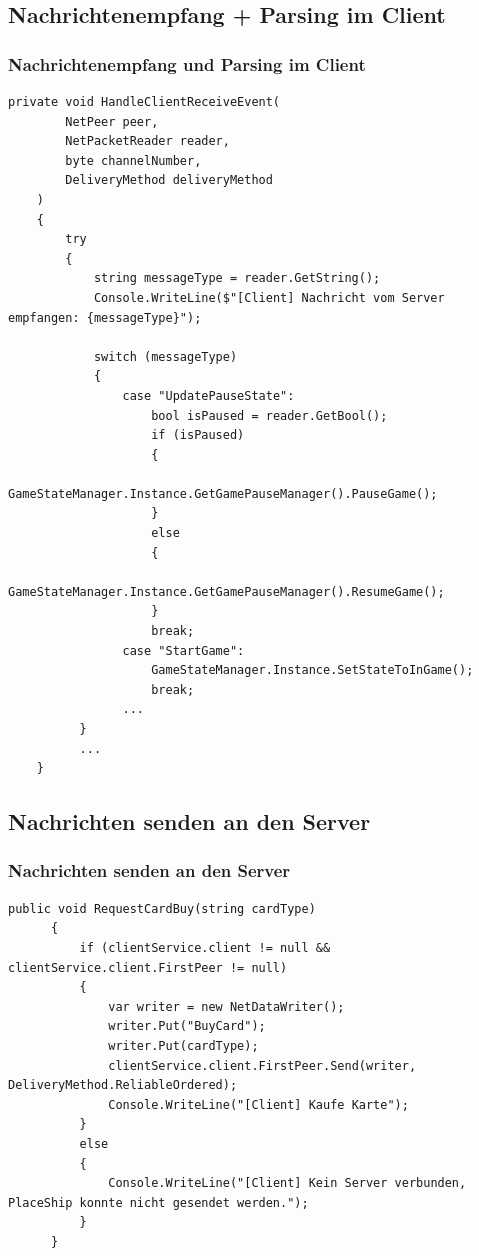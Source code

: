 \documentclass{beamer}
\begin{document}
\subsection{Nachrichtenempfang + Parsing im Client}
\begin{frame}[fragile]
\frametitle{Nachrichtenempfang und Parsing im Client}
  \begin{lstlisting}[language=CSharp, basicstyle=\ttfamily\tiny, breaklines=true]
     private void HandleClientReceiveEvent(
        NetPeer peer,
        NetPacketReader reader,
        byte channelNumber,
        DeliveryMethod deliveryMethod
    )
    {
        try
        {
            string messageType = reader.GetString();
            Console.WriteLine($"[Client] Nachricht vom Server empfangen: {messageType}");

            switch (messageType)
            {
                case "UpdatePauseState":
                    bool isPaused = reader.GetBool();
                    if (isPaused)
                    {
                        GameStateManager.Instance.GetGamePauseManager().PauseGame();
                    }
                    else
                    {
                        GameStateManager.Instance.GetGamePauseManager().ResumeGame();
                    }
                    break;
                case "StartGame":
                    GameStateManager.Instance.SetStateToInGame();
                    break;
                ...
          }
          ...
    }
  \end{lstlisting}
\end{frame}

\subsection{Nachrichten senden an den Server}
\begin{frame}[fragile]
\frametitle{Nachrichten senden an den Server}
  \begin{lstlisting}[language=CSharp, basicstyle=\ttfamily\tiny, breaklines=true]
    public void RequestCardBuy(string cardType)
      {
          if (clientService.client != null && clientService.client.FirstPeer != null)
          {
              var writer = new NetDataWriter();
              writer.Put("BuyCard");
              writer.Put(cardType);
              clientService.client.FirstPeer.Send(writer, DeliveryMethod.ReliableOrdered);
              Console.WriteLine("[Client] Kaufe Karte");
          }
          else
          {
              Console.WriteLine("[Client] Kein Server verbunden, PlaceShip konnte nicht gesendet werden.");
          }
      }
  \end{lstlisting}
\end{frame}
\end{document}
